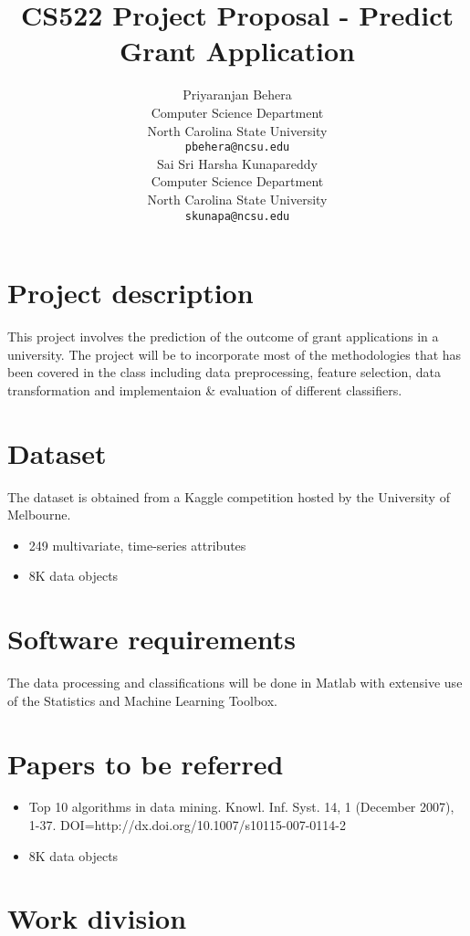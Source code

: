 \documentclass{article} %
\title{CS522 Project Proposal - Predict Grant Application}
\author{
Priyaranjan Behera\\
Computer Science Department\\
North Carolina State University\\
\texttt{pbehera@ncsu.edu} \\
\And
Sai Sri Harsha Kunapareddy\\
Computer Science Department\\
North Carolina State University\\
\texttt{skunapa@ncsu.edu} \\
}
\begin{document}
\maketitle


\section{Project description}

This project involves the prediction of the outcome of grant applications in a university. The project will be to incorporate most of the methodologies that has been covered in the class including data preprocessing, feature selection, data transformation and implementaion \& evaluation of different classifiers. 

\section{Dataset}

The dataset is obtained from a Kaggle competition hosted by the University of Melbourne.
\begin{itemize}
	\item 249 multivariate, time-series attributes
	\item 8K data objects
\end{itemize}

\section{Software requirements}

The data processing and classifications will be done in Matlab with extensive use of the Statistics and Machine Learning Toolbox.

\section{Papers to be referred}

\begin{itemize}
	\item Top 10 algorithms in data mining. Knowl. Inf. Syst. 14, 1 (December 2007), 1-37. DOI=http://dx.doi.org/10.1007/s10115-007-0114-2
	\item 8K data objects
\end{itemize}


\section{Work division}
\end{document}
